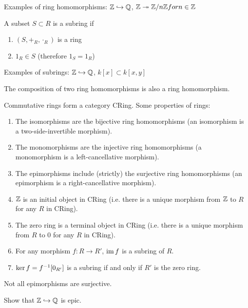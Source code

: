 \begin{exam}
	Examples of ring homomorphisms: $\mathbb{Z} \hookrightarrow \mathbb{Q}$, $\mathbb{Z} \twoheadrightarrow \mathbb{Z}/n\mathbb{Z} for n \in \mathbb{Z}$
\end{exam}

\begin{defn}
	A subset $S \subset R$ is a subring if
	\begin{enumerate}
		\item $(S,+_R,\cdot_R)$ is a ring
		\item $1_R \in S$ (therefore $1_S=1_R$)
	\end{enumerate}
\end{defn}

\begin{exam}
	Examples of subrings: $\mathbb{Z} \hookrightarrow \mathbb{Q}$, $k[x] \subset k[x,y]$
\end{exam}

\begin{rmk}	
	The composition of two ring homomorphisms is also a ring homomorphism.
\end{rmk}

\begin{prop}
	Commutative rings form a category CRing.
	Some properties of rings:
	\begin{enumerate}
		\item The isomorphisms are the bijective ring homomorphisms (an isomorphism is a two-side-invertible morphism).
		\item The monomorphisms are the injective ring homomorphisms (a monomorphism is a left-cancellative morphism).
		\item The epimorphisms include (strictly) the surjective ring homomorphisms (an epimorphism is a right-cancellative morphism).
		\item $\mathbb{Z}$ is an initial object in CRing (i.e. there is a unique morphism from $\mathbb{Z}$ to $R$ for any $R$ in CRing).
		\item The zero ring is a terminal object in CRing (i.e. there is a unique morphism from $R$ to $0$ for any $R$ in CRing).
		\item For any morphism $f: R \to R'$, $\operatorname{im} f$ is a subring of $R$.
		\item $\ker f = f^{-1}[0_{R'}]$ is a subring if and only if $R'$ is the zero ring.
	\end{enumerate}
\end{prop}

Not all epimorphisms are surjective.
\begin{exer}
	Show that $\mathbb{Z} \hookrightarrow \mathbb{Q}$ is epic.
\end{exer}


